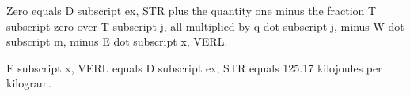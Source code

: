 Zero equals D subscript ex, STR plus the quantity one minus the fraction T subscript zero over T subscript j, all multiplied by q dot subscript j, minus W dot subscript m, minus E dot subscript x, VERL.

E subscript x, VERL equals D subscript ex, STR equals 125.17 kilojoules per kilogram.